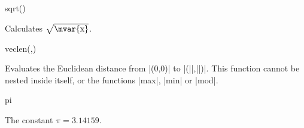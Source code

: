 \begin{math-function}{sqrt()}

 Calculates $\sqrt{\textrm{\mvar{x}}}$.

\begin{codeexample}[post=\tt\footnotesize\pgfmathresult]
\end{codeexample}

\begin{codeexample}[post=\tt\footnotesize\pgfmathresult]
\end{codeexample}

\end{math-function}

\begin{math-function}{veclen(,)}

	Evaluates the Euclidean distance from |(0,0)| to |(||,||)|. 
	This function cannot be nested inside itself, or the functions |max|,
	|min| or |mod|.

\begin{codeexample}[post=\tt\footnotesize\pgfmathresult]
\end{codeexample}

\begin{codeexample}[post=\tt\footnotesize\pgfmathresult]
\end{codeexample}

\end{math-function}

\begin{math-constant}{pi}

	The constant $\pi=3.14159$.
	
\begin{codeexample}[post=\tt\footnotesize\pgfmathresult]
\end{codeexample}

\begin{codeexample}[post=\tt\footnotesize\pgfmathresult]
\end{codeexample}

\end{math-constant}

